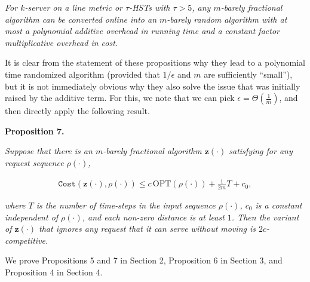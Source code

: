 \emph{For $k$-server on a line metric
or $\tau$-HSTs with $\tau>5$, any $m$-barely fractional algorithm can be converted online into an $m$-barely random algorithm with at most a polynomial additive overhead in running time and a constant factor multiplicative overhead in cost.}\par






It is clear from the statement of these propositions why they lead to a polynomial time randomized algorithm (provided that $1/\epsilon$ and $m$ are sufficiently “small”), but it is not immediately obvious why they also solve the issue that was initially raised by the additive term. For this, we note that we can pick $\epsilon=\Theta\left(\frac{1}{m}\right)$, and then directly apply the following result.\par





\par\medskip\noindent\textbf{
\textbf{Proposition 7}\textbf{.}
}\par



\emph{Suppose that there is an $m$-barely fractional algorithm ${\mathbf{z}}(\cdot)$ satisfying for any request sequence $\rho(\cdot)$,}\par


\[\begin{gathered}
{\texttt{Cost}}({\mathbf{z}}(\cdot),\rho(\cdot))\leq c\,{\text{OPT}}(\rho(\cdot))+\frac{1}{2m}T+c_{0},
\end{gathered}\]


\emph{where $T$ is the number of time-steps in the input sequence $\rho(\cdot)$, $c_{0}$ is a constant independent of $\rho(\cdot)$, and each non-zero distance is at least $1$. Then the variant of ${\mathbf{z}}(\cdot)$ that ignores any request that it can serve without moving is $2c$-competitive.}\par






We prove Propositions 5 and 7 in Section 2, Proposition 6 in Section 3, and Proposition 4 in Section 4.\par






